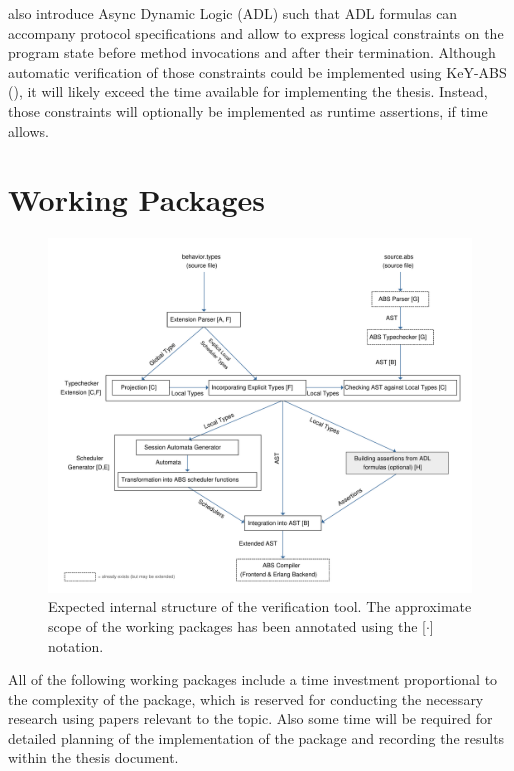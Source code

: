 \documentclass[paper=a4,nochapname,accentcolor=tud9c]{tudexercise}
\newcommand\textcitep[1]{\mkbibparens{\textcite{#1}}}
\begin{document}
\textcite{kamburjan2018stateful} also introduce Async Dynamic Logic (ADL) such that ADL formulas can
accompany protocol specifications and allow to express logical constraints on the
program state before method invocations and after their termination.
Although automatic verification of those constraints could  be implemented using
KeY-ABS \textcitep{din2015key}, it will likely exceed the time available for
implementing the thesis.
Instead, those constraints will optionally be implemented as runtime assertions,
if time allows.

\section{Working Packages}\label{workpackages}
%
\begin{figure}[H]
  \centering
  \includegraphics[width=\linewidth]{assets/architecture.pdf}
  \caption{Expected internal structure of the verification tool. The approximate scope of the working packages has been annotated using the [$\cdot$] notation.}
\end{figure}

All of the following working packages include a time investment proportional to the
complexity of the package, which is reserved for conducting the necessary
research using papers relevant to the topic. Also some time will be required for
detailed planning of the implementation of the package and recording the results
within the thesis document.
\end{document}
